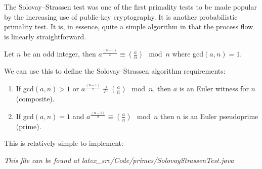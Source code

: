     The Solovay--Strassen test was one of the first primality tests to be made popular by the increasing use of public-key cryptography. It is another probabilistic primality test. It is, in essence, quite a simple algorithm in that the process flow is linearly straightforward. \\
    
    \begin{mathdef}
      Let $n$ be an odd integer, then $a^{\frac{(n-1)}{2}} \equiv (\frac{a}{n}) \mod{n}$ where gcd$(a,n) = 1$.
    \end{mathdef}
    
    We can use this to define the Solovay--Strassen algorithm requirements:
    
    \begin{enumerate}
      \item If gcd$(a,n) > 1$ or $a^{\frac{(n-1)}{2}} \not\equiv (\frac{a}{n}) \mod{n}$, then $a$ is an Euler witness for $n$ (composite).
      \item If gcd$(a,n) = 1$ and $a^{\frac{(n-1)}{2}} \equiv (\frac{a}{n}) \mod{n}$ then $n$ is an Euler pseudoprime (prime).
    \end{enumerate}
    
    This is relatively simple to implement:
    
    
    \emph{This file can be found at latex\_src/Code/primes/SolovayStrassenTest.java} \\
    

